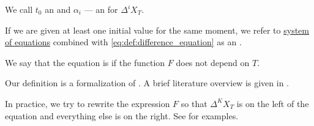 \begin{definition}
\begin{thmenum}
    We call \( t_0 \) an  and \( \alpha_i \) --- an  for \( \Delta^i X_T \).

    If we are given at least one initial value for the same moment, we refer to \hyperref[def:equation/system]{system of equations} combined with \eqref{eq:def:difference_equation} as an .

     We say that the equation is  if the function \( F \) does not depend on \( T \).
  \end{thmenum}
\end{definition}
\begin{comments}
  \item Our definition is a formalization of \cite[307]{Гельфонд1959ИсчислениеКонечныхРазностей}. A brief literature overview is given in .

  \item In practice, we try to rewrite the expression \( F \) so that \( \Delta^K X_T \) is on the left of the equation and everything else is on the right. See  for examples.
\end{comments}

